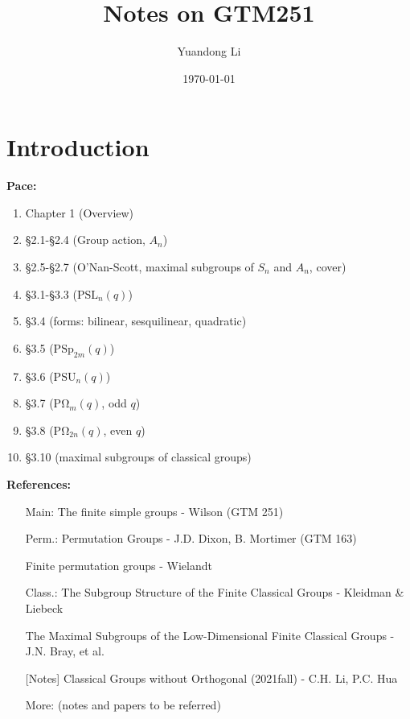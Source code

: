 \documentclass[a4,11pt]{article}
\title{Notes on GTM251}
\author{Yuandong Li}
\date{\today}
\def\PSL{\mathrm{PSL}}
\def\PSU{\mathrm{PSU}}
\def\PSp{\mathrm{PSp}}
\def\PO{\mathrm{P\Omega}}
\def\PSL{\mathrm{PSL}}
\begin{document}
\maketitle

\tableofcontents
\newpage

\section{Introduction}
\textbf{Pace: }
\begin{enumerate}[Lesson 1:]
	\item Chapter 1 (Overview)
	\item \S 2.1-\S 2.4 (Group action, $A_n$)
	\item \S 2.5-\S 2.7 (O'Nan-Scott, maximal subgroups of $S_n$ and $A_n$, cover)
	\item \S 3.1-\S 3.3 ($\PSL_n(q)$)
	\item \S 3.4 (forms: bilinear, sesquilinear, quadratic)
	\item \S 3.5 ($\PSp_{2m}(q)$)
	\item \S 3.6 ($\PSU_n(q)$)
	\item \S 3.7 ($\PO_{m}(q)$, odd $q$)
	\item \S 3.8 ($\PO_{2n}(q)$, even $q$)
	\item \S 3.10 (maximal subgroups of classical groups)
\end{enumerate}

\vline 

\noindent \textbf{References:}
\begin{itemize}
	\item[Main:] The finite simple groups - Wilson (GTM 251)
	\item[Perm.:] Permutation Groups - J.D. Dixon, B. Mortimer (GTM 163)
	\item[ ] Finite permutation groups - Wielandt
	\item[Class.:] The Subgroup Structure of the Finite Classical Groups - Kleidman \& Liebeck
	\item[ ] The Maximal Subgroups of the Low-Dimensional Finite Classical Groups - J.N. Bray, et al.
		\item[ ] [Notes] Classical Groups without Orthogonal (2021fall) - C.H. Li, P.C. Hua
	\item[More:] (notes and papers to be referred)
	\item[ ]
\end{itemize}


\newpage
\end{document}
